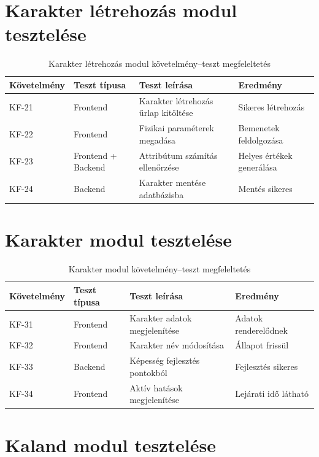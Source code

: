 \documentclass[
]{thesis-ekf}
\theoremstyle{definition}
\theoremstyle{remark}
\begin{document}
\section{Karakter létrehozás modul tesztelése}

\begin{table}[H]
\centering
\begin{tabularx}{\textwidth}{|l|l|X|X|}
\hline
\textbf{Követelmény} & \textbf{Teszt típusa} & \textbf{Teszt leírása} & \textbf{Eredmény} \\ \hline
KF-21 & Frontend & Karakter létrehozás űrlap kitöltése & Sikeres létrehozás \\ \hline
KF-22 & Frontend & Fizikai paraméterek megadása & Bemenetek feldolgozása \\ \hline
KF-23 & Frontend + Backend & Attribútum számítás ellenőrzése & Helyes értékek generálása \\ \hline
KF-24 & Backend & Karakter mentése adatbázisba & Mentés sikeres \\ \hline
\end{tabularx}
\caption{Karakter létrehozás modul követelmény–teszt megfeleltetés}
\label{tab_char_create_tests}
\end{table}

\section{Karakter modul tesztelése}

\begin{table}[!ht]
\centering
\begin{tabularx}{\textwidth}{|l|l|X|X|}
\hline
\textbf{Követelmény} & \textbf{Teszt típusa} & \textbf{Teszt leírása} & \textbf{Eredmény} \\ \hline
KF-31 & Frontend & Karakter adatok megjelenítése & Adatok renderelődnek \\ \hline
KF-32 & Frontend & Karakter név módosítása & Állapot frissül \\ \hline
KF-33 & Backend & Képesség fejlesztés pontokból & Fejlesztés sikeres \\ \hline
KF-34 & Frontend & Aktív hatások megjelenítése & Lejárati idő látható \\ \hline
\end{tabularx}
\caption{Karakter modul követelmény–teszt megfeleltetés}
\label{tab_char_tests}
\end{table}

\section{Kaland modul tesztelése}
\end{document}
